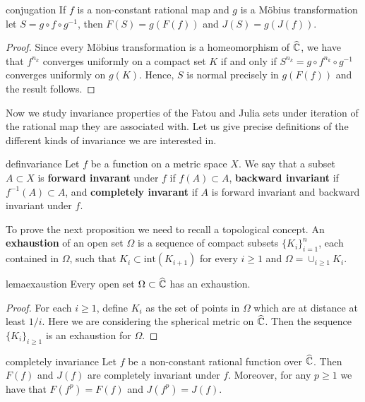 \begin{myprop}{}{conjugation}
If $f$ is a non-constant rational map and $g$ is a Möbius transformation let $S= g\circ f\circ g^{-1}$, then $F(S) = g(F(f))$ and $J(S)=g(J(f))$. 
\end{myprop}

\begin{proof}
Since every Möbius transformation is a homeomorphism of $\widehat{\mathbb{C}}$, we have that $f^{n_k}$ converges uniformly on a compact set $K$ if and only if $S^{n_k}=g\circ f^{n_k} \circ g^{-1}$ converges uniformly on $g(K)$. Hence, $S$ is normal precisely in $g(F(f))$ and the result follows.
\end{proof}

Now we study invariance properties of the Fatou and Julia sets under iteration of the rational map they are associated with. Let us give precise definitions of the different kinds of invariance we are interested in.\\
 
\begin{mydef}{}{definvariance}
Let $f$ be a function on a metric space $X$. We say that a subset $A\subset X$ is {\bf forward invarant} under $f$ if $f(A)\subset A$, {\bf backward invariant} if $f^{-1}(A)\subset A$, and {\bf completely invarant} if $A$ is forward invariant and backward invariant under $f$.
\end{mydef}

To prove the next proposition we need to recall a topological concept. An {\bf exhaustion} of an open set $\Omega$ is a sequence of compact subsets $\{K_i\}_{i=1}^n$, each contained in $\Omega$, such that $K_i \subset \text{int}(K_{i+1})$ for every $i\geq 1$ and $\Omega = \cup_{i\geq 1} K_i$.

\begin{mylema}{}{lemaexaustion}
Every open set $\Omega\subset \widehat{\mathbb{C}}$ has an exhaustion.
\end{mylema}
 
\begin{proof}
For each $i\geq 1$, define $K_i$ as the set of points in $\Omega$ which are at distance at least $1/i$. Here we are considering the spherical metric on $\widehat{\mathbb{C}}$. Then the sequence $\{K_i\}_{i\geq 1}$ is an exhaustion for $\Omega$.
\end{proof}

\begin{myprop}{}{completely invariance}
Let $f$ be a non-constant rational function over $\widehat{\mathbb{C}}$. Then $F(f)$ and $J(f)$ are completely invariant under $f$. Moreover, for any $p\geq 1$ we have that $F(f^p)=F(f)$ and $J(f^p) = J(f)$.
\end{myprop}

